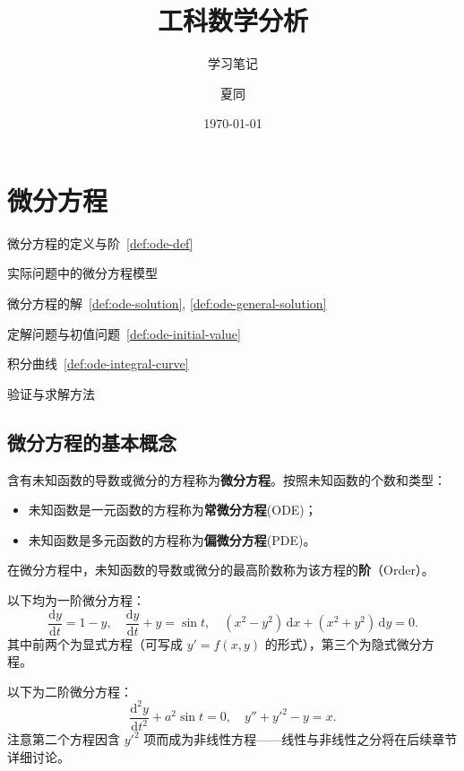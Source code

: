 \documentclass[lang=cn,11pt]{elegantbook}
\title{工科数学分析}
\subtitle{学习笔记}
\author{夏同}
\institute{华南理工大学}
\date{\today}
\begin{document}
\maketitle
\frontmatter

\tableofcontents
\makeenvindex
\mainmatter

\chapter{微分方程}

\begin{introduction}
  \item 微分方程的定义与阶~\ref{def:ode-def}
  \item 实际问题中的微分方程模型
  \item 微分方程的解~\ref{def:ode-solution}, \ref{def:ode-general-solution}
  \item 定解问题与初值问题~\ref{def:ode-initial-value}
  \item 积分曲线~\ref{def:ode-integral-curve}
  \item 验证与求解方法
\end{introduction}

\section{微分方程的基本概念}

\begin{definition}[微分方程] \label{def:ode-def}
含有未知函数的导数或微分的方程称为\textbf{微分方程}。按照未知函数的个数和类型：
\begin{itemize}
    \item 未知函数是一元函数的方程称为\textbf{常微分方程}(ODE)；
    \item 未知函数是多元函数的方程称为\textbf{偏微分方程}(PDE)。
\end{itemize}
在微分方程中，未知函数的导数或微分的最高阶数称为该方程的\textbf{阶}（Order）。
\end{definition}

\begin{exercise}[一阶微分方程]
以下均为一阶微分方程：
\[
\frac{\mathrm{d}y}{\mathrm{d}t}=1-y,\quad
\frac{\mathrm{d}y}{\mathrm{d}t}+y=\sin t,\quad
(x^2-y^2)\,\mathrm{d}x+(x^2+y^2)\,\mathrm{d}y=0.
\]
其中前两个为显式方程（可写成 $y' = f(x,y)$ 的形式），第三个为隐式微分方程。
\end{exercise}

\begin{exercise}[二阶微分方程]
以下为二阶微分方程：
\[
\frac{\mathrm{d}^2y}{\mathrm{d}t^2}+a^2\sin t=0,\quad
y''+y'^2-y=x.
\]
注意第二个方程因含 $y'^2$ 项而成为非线性方程——线性与非线性之分将在后续章节详细讨论。
\end{exercise}
\end{document}
